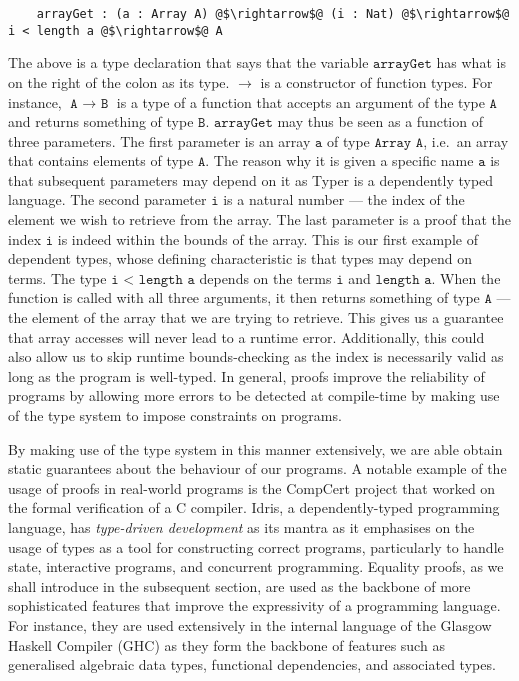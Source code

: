 \documentclass[12pt,twoside,maitrise]{dms}
\theoremstyle{definition}
\numberwithin{equation}{section}
\numberwithin{table}{chapter}
\numberwithin{figure}{chapter}
\newcommand\id[1] {\texttt{#1}}
\newcommand\fn[1] {\texttt{#1}}
\begin{document}
\begin{verbatim}
    arrayGet : (a : Array A) @$\rightarrow$@ (i : Nat) @$\rightarrow$@ i < length a @$\rightarrow$@ A
\end{verbatim}

The above is a type declaration that says that the variable $\fn{arrayGet}$ has
what is on the right of the colon as its type. $\rightarrow$ is a constructor of
function types. For instance, $\fn{A $\rightarrow$ B}$ is a type of a function
that accepts an argument of the type $\fn{A}$ and returns something of type
$\fn{B}$. $\fn{arrayGet}$ may thus be seen as a function of three parameters.
The first parameter is an array $\fn{a}$ of type $\fn{Array A}$, i.e.\ an array
that contains elements of type $\fn{A}$. The reason why it is given a specific
name $\fn{a}$ is that subsequent parameters may depend on it as Typer is a
dependently typed language. The second parameter $\fn{i}$ is a natural number
--- the index of the element we wish to retrieve from the array. The last
parameter is a proof that the index $\id{i}$ is indeed within the bounds of the
array. This is our first example of dependent types, whose defining
characteristic is that types may depend on terms. The type $\fn{i < length a}$
depends on the terms $\fn{i}$ and $\fn{length a}$. When the function is called
with all three arguments, it then returns something of type $\fn{A}$ --- the
element of the array that we are trying to retrieve. This gives us a guarantee
that array accesses will never lead to a runtime error. Additionally, this could
also allow us to skip runtime bounds-checking as the index is necessarily valid
as long as the program is well-typed. In general, proofs improve the reliability
of programs by allowing more errors to be detected at compile-time by making use
of the type system to impose constraints on programs.

By making use of the type system in this manner extensively, we are able obtain
static guarantees about the behaviour of our programs. A notable example of the
usage of proofs in real-world programs is the CompCert project that worked on
the formal verification of a C compiler\cite{Leroy-Compcert-CACM}. Idris, a
dependently-typed programming language, has \emph{type-driven development} as
its mantra as it emphasises on the usage of types as a tool for constructing
correct programs, particularly to handle state, interactive programs, and
concurrent programming. Equality proofs, as we shall introduce in the subsequent
section, are used as the backbone of more sophisticated features that improve
the expressivity of a programming language. For instance, they are used
extensively in the internal language of the Glasgow Haskell Compiler (GHC) as
they form the backbone of features such as generalised algebraic data types,
functional dependencies, and associated types\cite{sulzmann2007systemfeq}.
\end{document}
